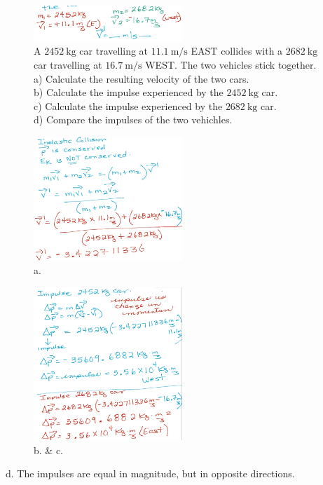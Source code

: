 \documentclass[a4paper,12pt]{article}
\begin{document}
\begin{figure}[H]
    \centering
    \caption{A $\SI{2452}{\kg}$ car travelling at $\SI{11.1}{\m\per\s}$ EAST collides with a $\SI{2682}{\kg}$ car travelling at $\SI{16.7}{\m\per\s}$ WEST. The two vehicles stick together. \\a) Calculate the resulting velocity of the two cars. \\b) Calculate the impulse experienced by the $\SI{2452}{\kg}$ car. \\c) Calculate the impulse experienced by the $\SI{2682}{\kg}$ car. \\d) Compare the impulses of the two vehichles.}
    \includegraphics[width=0.5\textwidth]{q-inelastic-2}
\end{figure}
\begin{figure}[H]
    \centering
    \caption{a.}
    \includegraphics[width=0.50\textwidth]{q-inelastic-2b}
\end{figure}
\begin{figure}[H]
    \centering
    \caption{b. \& c.}
    \includegraphics[width=0.50\textwidth]{q-inelastic-2c}
\end{figure}
d. The impulses are equal in magnitude, but in opposite directions.
\end{document}
